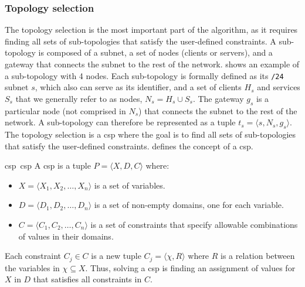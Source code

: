 \subsubsection{Topology selection}

The topology selection is the most important part of the algorithm, as it requires finding all sets of sub-topologies that satisfy the user-defined constraints.
A sub-topology is composed of a subnet, a set of nodes (clients or servers), and a gateway that connects the subnet to the rest of the network.
 shows an example of a sub-topology with 4 nodes.
Each sub-topology is formally defined as its \texttt{/24} subnet $s$, which also can serve as its identifier, and a set of clients $H_s$ and services $S_s$ that we generally refer to as nodes, \ie $N_s = H_s \cup S_s$.
The gateway $g_s$ is a particular node (not comprised in $N_s$) that connects the subnet to the rest of the network.
A sub-topology can therefore be represented as a tuple $t_s = \langle s, N_s, g_s \rangle$.
The topology selection is a \gls{csp} where the goal is to find all sets of sub-topologies that satisfy the user-defined constraints.
 defines the concept of a \gls{csp}.

\begin{definitionbox}{\acrfull{csp}~\normalfont\cite{russell_Artificialintelligencemodern_2021}}{csp}
  A \acrfull{csp} is a tuple $P = \langle X, D, C \rangle$ where:
  \begin{itemize}
    \item $X = \langle X_1, X_2, \ldots, X_n \rangle$ is a set of variables.
    \item $D = \langle D_1, D_2, \ldots, D_n \rangle$ is a set of non-empty domains, one for each variable.
    \item $C = \langle C_1, C_2, \ldots, C_n \rangle$ is a set of constraints that specify allowable combinations of values in their domains.
  \end{itemize}

  Each constraint $C_j \in C$ is a new tuple $C_j = \langle \chi, R \rangle$ where $R$ is a relation between the variables in $\chi \subseteq X$.
  Thus, solving a \gls{csp} is finding an assignment of values for $X$ in $D$ that satisfies all constraints in $C$.
\end{definitionbox}


